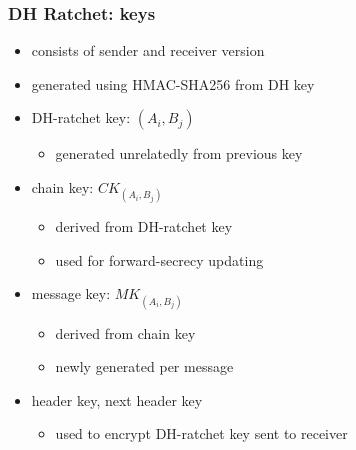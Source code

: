 \begin{frame}
	\frametitle{DH Ratchet: keys}

	\begin{itemize}
	\item	consists of sender and receiver version
	\item	generated using HMAC-SHA256 from DH key
	\vspace{5mm}
	\pause
	\item	DH-ratchet key: {\color{blue}$(A_i,B_j)$}
		\begin{itemize}
		\item	generated unrelatedly from previous key
		\end{itemize}
	\item	chain key: {\color{PineGreen}$CK_{(A_i,B_j)}$}
		\begin{itemize}
		\item	derived from DH-ratchet key
		\item	used for forward-secrecy updating
		\end{itemize}
	\item	message key: {\color{red}$MK_{(A_i,B_j)}$}
		\begin{itemize}
		\item	derived from chain key
		\item	newly generated per message
		\end{itemize}
	\pause
	\item	header key, next header key
		\begin{itemize}
		\item	used to encrypt DH-ratchet key sent to receiver
		\end{itemize}
	\end{itemize}
	
	
\end{frame}



